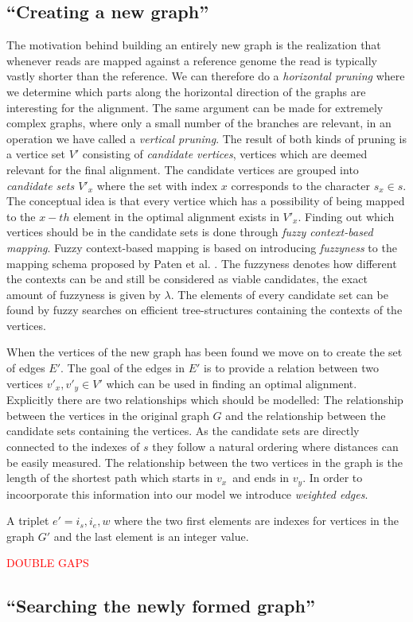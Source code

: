 \documentclass[thesis.tex]{subfiles}
\begin{document}
\subsection{``Creating a new graph''}
The motivation behind building an entirely new graph is the realization that whenever reads are mapped against a reference genome the read is typically vastly shorter than the reference. We can therefore do a \textit{horizontal pruning} where we determine which parts along the horizontal direction of the graphs are interesting for the alignment. The same argument can be made for extremely complex graphs, where only a small number of the branches are relevant, in an operation we have called a \textit{vertical pruning}. The result of both kinds of pruning is a vertice set $V'$ consisting of \textit{candidate vertices}, vertices which are deemed relevant for the final alignment. The candidate vertices are grouped into \textit{candidate sets $V'_x$} where the set with index $x$ corresponds to the character $s_x \in s$. The conceptual idea is that every vertice which has a possibility of being mapped to the $x-th$ element in the optimal alignment exists in $V'_x$. Finding out which vertices should be in the candidate sets is done through \textit{fuzzy context-based mapping}. Fuzzy context-based mapping is based on introducing \textit{fuzzyness} to the mapping schema proposed by Paten et al. \cite{mapping_to_a_reference_genome_structure}. The fuzzyness denotes how different the contexts can be and still be considered as viable candidates, the exact amount of fuzzyness is given by $\lambda$. The elements of every candidate set can be found by fuzzy searches on efficient tree-structures containing the contexts of the vertices.\\
\par\noindent
When the vertices of the new graph has been found we move on to create the set of edges $E'$. The goal of the edges in $E'$ is to provide a relation between two vertices $v'_x, v'_y \in V'$ which can be used in finding an optimal alignment. Explicitly there are two relationships which should be modelled: The relationship between the vertices in the original graph $G$ and the relationship between the candidate sets containing the vertices. As the candidate sets are directly connected to the indexes of $s$ they follow a natural ordering where distances can be easily measured. The relationship between the two vertices in the graph is the length of the shortest path which starts in $v_x$ and ends in $v_y$. In order to incoorporate this information into our model we introduce \textit{weighted edges}.
\begin{defn}
	A triplet $e'={i_s, i_e, w}$ where the two first elements are indexes for vertices in the graph $G'$ and the last element is an integer value.
\end{defn}
\textcolor{red}{DOUBLE GAPS}
\subsection{``Searching the newly formed graph''}
\end{document}
